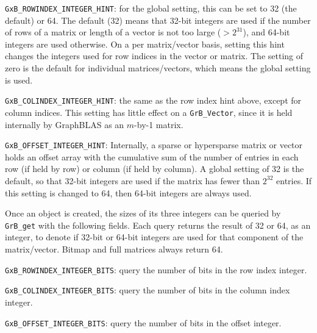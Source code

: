 \begin{packed_itemize}
\item \verb'GxB_ROWINDEX_INTEGER_HINT': for the global setting, this can be
set to 32 (the default) or 64.  The default (32) means that 32-bit integers are
used if the number of rows of a matrix or length of a vector is not too
large ($>2^{31}$), and 64-bit integers are used otherwise.  On a per
matrix/vector basis, setting this hint changes the integers used for row
indices in the vector or matrix.  The setting of zero is the default for
individual matrices/vectors, which means the global setting is used.
\item \verb'GxB_COLINDEX_INTEGER_HINT':  the same as the row index hint above,
except for column indices.  This setting has little effect on a
\verb'GrB_Vector', since it is held internally by GraphBLAS as an $m$-by-1
matrix.
\item \verb'GxB_OFFSET_INTEGER_HINT':  Internally, a sparse or hypersparse
matrix or vector holds an offset array with the cumulative sum of the number of
entries in each row (if held by row) or column (if held by column).  A global
setting of 32 is the default, so that 32-bit integers are used if the matrix
has fewer than $2^{32}$ entries. If this setting is changed to 64, then 64-bit
integers are always used.
\end{packed_itemize}

Once an object is created, the sizes of its three integers can be
queried by \verb'GrB_get' with the following fields.  Each query returns the
result of 32 or 64, as an integer, to denote if 32-bit or 64-bit integers are
used for that component of the matrix/vector.  Bitmap and full matrices always
return 64.

\begin{packed_itemize}
\item \verb'GxB_ROWINDEX_INTEGER_BITS': query the number of bits in the row index integer.
\item \verb'GxB_COLINDEX_INTEGER_BITS': query the number of bits in the column index integer.
\item \verb'GxB_OFFSET_INTEGER_BITS': query the number of bits in the offset integer.
\end{packed_itemize}


